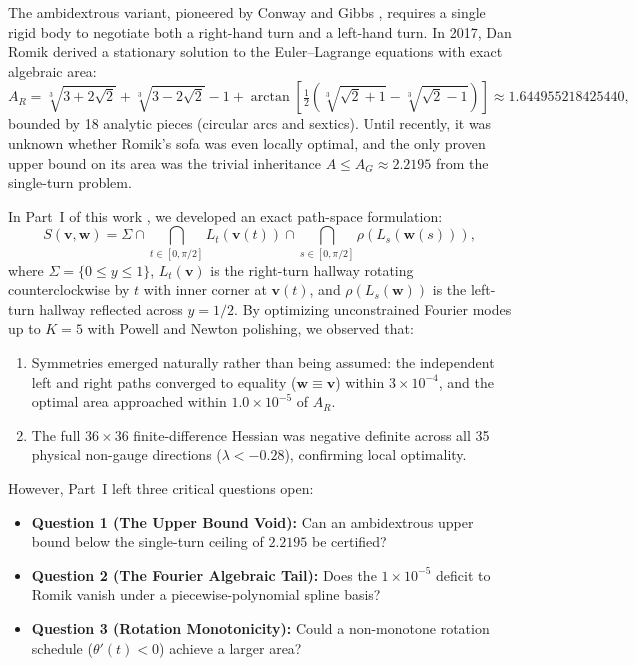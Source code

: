 \documentclass[11pt]{article}
\newcommand{\vpath}{\mathbf{v}}
\newcommand{\wpath}{\mathbf{w}}
\begin{document}
The ambidextrous variant, pioneered by Conway and Gibbs \cite{gibbs}, requires a single rigid body to negotiate both a right-hand turn and a left-hand turn. In 2017, Dan Romik \cite{romik} derived a stationary solution to the Euler--Lagrange equations with exact algebraic area:
\begin{equation}
A_R = \sqrt[3]{3+2\sqrt{2}} + \sqrt[3]{3-2\sqrt{2}} - 1 + \arctan\left[\tfrac{1}{2}\left(\sqrt[3]{\sqrt{2}+1} - \sqrt[3]{\sqrt{2}-1}\right)\right] \approx 1.644955218425440,
\label{eq:romik}
\end{equation}
bounded by 18 analytic pieces (circular arcs and sextics). Until recently, it was unknown whether Romik's sofa was even locally optimal, and the only proven upper bound on its area was the trivial inheritance $A \le A_G \approx 2.2195$ from the single-turn problem.

In Part~I of this work \cite{mohammed1}, we developed an exact path-space formulation:
\begin{equation}
S(\vpath, \wpath) = \Sigma \cap \bigcap_{t \in [0, \pi/2]} L_t(\vpath(t)) \cap \bigcap_{s \in [0, \pi/2]} \rho(L_s(\wpath(s))),
\end{equation}
where $\Sigma = \{0 \le y \le 1\}$, $L_t(\vpath)$ is the right-turn hallway rotating counterclockwise by $t$ with inner corner at $\vpath(t)$, and $\rho(L_s(\wpath))$ is the left-turn hallway reflected across $y = 1/2$. By optimizing unconstrained Fourier modes up to $K=5$ with Powell and Newton polishing, we observed that:
\begin{enumerate}
\item Symmetries emerged naturally rather than being assumed: the independent left and right paths converged to equality ($\wpath \equiv \vpath$) within $3\times10^{-4}$, and the optimal area approached within $1.0\times10^{-5}$ of $A_R$.
\item The full $36\times36$ finite-difference Hessian was negative definite across all 35 physical non-gauge directions ($\lambda < -0.28$), confirming local optimality.
\end{enumerate}

However, Part~I left three critical questions open:
\begin{itemize}
\item \textbf{Question 1 (The Upper Bound Void):} Can an ambidextrous upper bound below the single-turn ceiling of $2.2195$ be certified?
\item \textbf{Question 2 (The Fourier Algebraic Tail):} Does the $1\times10^{-5}$ deficit to Romik vanish under a piecewise-polynomial spline basis?
\item \textbf{Question 3 (Rotation Monotonicity):} Could a non-monotone rotation schedule ($\theta'(t) < 0$) achieve a larger area?
\end{itemize}
\end{document}
